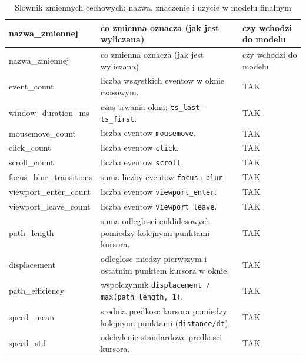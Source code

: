 \begin{longtable}{
  >{\ttfamily\scriptsize\raggedright\arraybackslash\hspace{0pt}}p{}
  @{\hspace{1.0em}}
  >{\footnotesize\raggedright\arraybackslash}p{}
  @{\hspace{0.8em}}
  >{\footnotesize\centering\arraybackslash}p{}
}
\caption{Slownik zmiennych cechowych: nazwa, znaczenie i uzycie w modelu finalnym}
\label{tab:feature-dictionary} \\
\toprule
\textnormal{nazwa\_zmiennej} & \textnormal{co zmienna oznacza (jak jest wyliczana)} & \textnormal{czy wchodzi do modelu} \\
\midrule
\endfirsthead
\toprule
\textnormal{nazwa\_zmiennej} & \textnormal{co zmienna oznacza (jak jest wyliczana)} & \textnormal{czy wchodzi do modelu} \\
\midrule
\endhead
\textnormal{event\_count} & liczba wszystkich eventow w oknie czasowym. & TAK \\
\textnormal{window\_duration\_ms} & czas trwania okna: \texttt{ts\_last - ts\_first}. & TAK \\
\textnormal{mousemove\_count} & liczba eventow \texttt{mousemove}. & TAK \\
\textnormal{click\_count} & liczba eventow \texttt{click}. & TAK \\
\textnormal{scroll\_count} & liczba eventow \texttt{scroll}. & TAK \\
\textnormal{focus\_blur\_transitions} & suma liczby eventow \texttt{focus} i \texttt{blur}. & TAK \\
\textnormal{viewport\_enter\_count} & liczba eventow \texttt{viewport\_enter}. & TAK \\
\textnormal{viewport\_leave\_count} & liczba eventow \texttt{viewport\_leave}. & TAK \\
\textnormal{path\_length} & suma odleglosci euklidesowych pomiedzy kolejnymi punktami kursora. & TAK \\
\textnormal{displacement} & odleglosc miedzy pierwszym i ostatnim punktem kursora w oknie. & TAK \\
\textnormal{path\_efficiency} & wspolczynnik \texttt{displacement / max(path\_length, 1)}. & TAK \\
\textnormal{speed\_mean} & srednia predkosc kursora pomiedzy kolejnymi punktami (\texttt{distance/dt}). & TAK \\
\textnormal{speed\_std} & odchylenie standardowe predkosci kursora. & TAK \\

\end{longtable}
